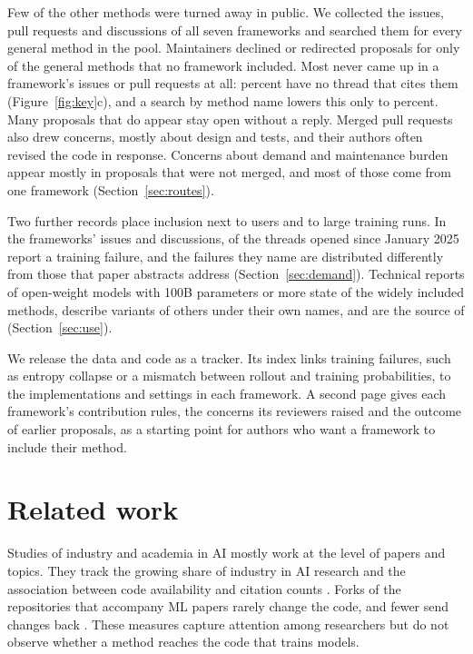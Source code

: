 \documentclass{article}
\begin{document}
Few of the other methods were turned away in public. We collected the issues, pull requests and discussions of all seven frameworks and searched them for every general method in the pool. Maintainers declined or redirected proposals for only \NRefusedPapers{} of the \NNotIncluded{} general methods that no framework included. Most never came up in a framework's issues or pull requests at all: \NNoRecordPct{} percent have no thread that cites them (Figure~\ref{fig:key}c), and a search by method name lowers this only to \NNoRecordAfterPct{} percent. Many proposals that do appear stay open without a reply. Merged pull requests also drew concerns, mostly about design and tests, and their authors often revised the code in response. Concerns about demand and maintenance burden appear mostly in proposals that were not merged, and most of those come from one framework (Section~\ref{sec:routes}).

Two further records place inclusion next to users and to large training runs. In the frameworks' issues and discussions, \NIssueFailure{} of the \NIssueUniverse{} threads opened since January 2025 report a training failure, and the failures they name are distributed differently from those that paper abstracts address (Section~\ref{sec:demand}). Technical reports of \NReports{} open-weight models with 100B parameters or more state \NReportsMethodsUsed{} of the \NWideMethods{} widely included methods, describe variants of others under their own names, and are the source of \NReportsSource{} (Section~\ref{sec:use}).

We release the data and code as a tracker. Its index links training failures, such as entropy collapse or a mismatch between rollout and training probabilities, to the implementations and settings in each framework. A second page gives each framework's contribution rules, the concerns its reviewers raised and the outcome of earlier proposals, as a starting point for authors who want a framework to include their method.

\section{Related work}

Studies of industry and academia in AI mostly work at the level of papers and topics. They track the growing share of industry in AI research \citep{ahmed2023industry} and the association between code availability and citation counts \citep{arxiv230810008}. Forks of the repositories that accompany ML papers rarely change the code, and fewer send changes back \citep{arxiv220311365}. These measures capture attention among researchers but do not observe whether a method reaches the code that trains models.
\end{document}

